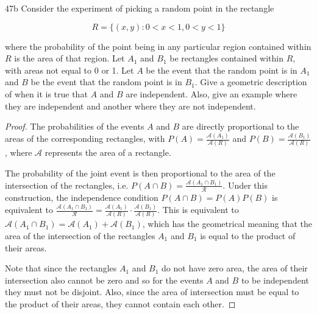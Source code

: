 \begin{exercise}{47b}
Consider the experiment of picking a random point in the rectangle

$$R = \{(x,y): 0 < x < 1, 0<y<1\}$$

where the probability of the point being in any particular region contained within $R$ is the area of that region. Let $A_1$ and $B_1$ be rectangles contained within $R$, with areas not equal to 0 or 1. Let $A$ be the event that the random point is in $A_1$ and $B$ be the event that the random point is in $B_1$. Give a geometric description of when it is true that $A$ and $B$ are independent. Also, give an example where they are independent and another where they are not independent.
\end{exercise}

\begin{proof}
    The probabilities of the events $A$ and $B$ are directly proportional to the areas of the corresponding rectangles, with $P(A) = \frac{\mathcal{A}(A_1)}{\mathcal{A}(R)}$ and $P(B) = \frac{\mathcal{A}(B_1)}{\mathcal{A}(R)}$, where $\mathcal{A}$ represents the area of a rectangle.

    The probability of the joint event is then proportional to the area of the intersection of the rectangles, i.e. $P(A \cap B) = \frac{\mathcal{A}(A_1 \cap B_1)}{\mathcal{R}}$. Under this construction, the independence condition $P(A \cap B) = P(A)P(B)$ is equivalent to $ \frac{\mathcal{A}(A_1 \cap B_1)}{\mathcal{R}} = \frac{\mathcal{A}(A_1)}{\mathcal{A}(R)} \cdot \frac{\mathcal{A}(B_1)}{\mathcal{A}(R)}$. This is equivalent to $\mathcal{A}(A_1 \cap B_1) = \mathcal{A}(A_1) + \mathcal{A}(B_1)$, which has the geometrical meaning that the area of the intersection of the rectangles $A_1$ and $B_1$ is equal to the product of their areas.

    Note that since the rectangles $A_1$ and $B_1$ do not have zero area, the area of their intersection also cannot be zero and so for the events $A$ and $B$ to be independent they must not be disjoint. Also, since the area of intersection must be equal to the product of their areas, they cannot contain each other.
\end{proof}

